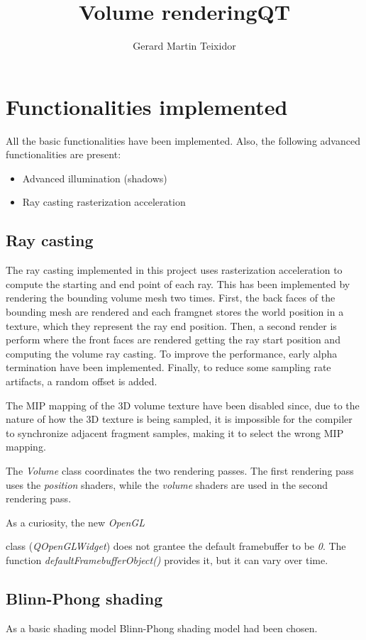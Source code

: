 \documentclass{article}
\title{Volume rendering}
\author{Gerard Martin Teixidor}
\begin{document}
\maketitle

\section*{Functionalities implemented}
All the basic functionalities have been implemented. Also, the following advanced functionalities are present:
\begin{itemize}
\item Advanced illumination (shadows)
\item Ray casting rasterization acceleration
\end{itemize}

\subsection*{Ray casting}
The ray casting implemented in this project uses rasterization acceleration to compute the starting and end point of each ray. This has been implemented by rendering the bounding volume mesh two times. First, the back faces of the bounding mesh are rendered and each framgnet stores the world position in a texture, which they represent the ray end position. Then, a second render is perform where the front faces are rendered getting the ray start position and computing the volume ray casting. To improve the performance, early alpha termination have been implemented.
Finally, to reduce some sampling rate artifacts, a random offset is added.

The MIP mapping of the 3D volume texture have been disabled since, due to the nature of how the 3D texture is being sampled, it is impossible for the compiler to synchronize adjacent fragment samples, making it to select the wrong MIP mapping.

The \textit{Volume} class coordinates the two rendering passes. The first rendering pass uses the  \textit{position} shaders, while the \textit{volume} shaders are used in the second rendering pass.

As a curiosity, the new \textit{OpenGL }\title{QT} class (\textit{QOpenGLWidget}) does not grantee the default framebuffer to be \textit{0}. The function \textit{defaultFramebufferObject()} provides it, but it can vary over time.


\subsection*{Blinn-Phong shading}
As a basic shading model Blinn-Phong shading model had been chosen.
\end{document}

